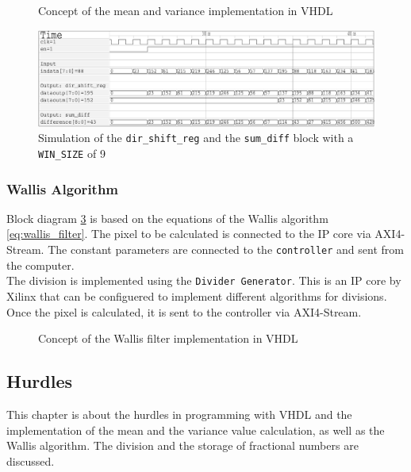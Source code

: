 \begin{figure}[tb!]
    \centering
    \begin{adjustbox}{max width=\textwidth, keepaspectratio}
        
    \end{adjustbox}
    \caption{Concept of the mean and variance implementation in VHDL}
    \label{fig:mean_var_vhdl}
\end{figure}

\begin{figure}[tb!]
    \centering
    \includegraphics[width=\textwidth]
    {images/image_processing/dir_shift_sum_diff.png}
    \caption{Simulation of the \texttt{dir\_shift\_reg} and the
    \texttt{sum\_diff} block with a \texttt{WIN\_SIZE} of 9}
    \label{fig:sim_shift_sum}
\end{figure}


\subsubsection*{Wallis Algorithm}
Block diagram \ref{fig:wallis_vhdl} is based on the equations of the Wallis algorithm \ref{eq:wallis_filter}.
The pixel to be calculated is connected to the IP core via AXI4-Stream. The constant parameters are connected to the \texttt{controller} and sent from the computer. \\
The division is implemented using the \texttt{Divider Generator}. This is an IP
core
by Xilinx that can be configuered to implement different algorithms for
divisions. Once the pixel is calculated, it is sent to the controller via AXI4-Stream.

\begin{figure}[tb!]
    \centering
    \begin{adjustbox}{max width=\textwidth}
        
    \end{adjustbox}
    \caption{Concept of the Wallis filter implementation in VHDL}
    \label{fig:wallis_vhdl}
\end{figure}

\subsection{Hurdles} \label{ch:ip:hurdles_vhdl}
This chapter is about the hurdles in programming with VHDL and the
implementation of the mean and the variance value calculation, as well as the
Wallis algorithm.
The division and the storage of fractional numbers are discussed.

